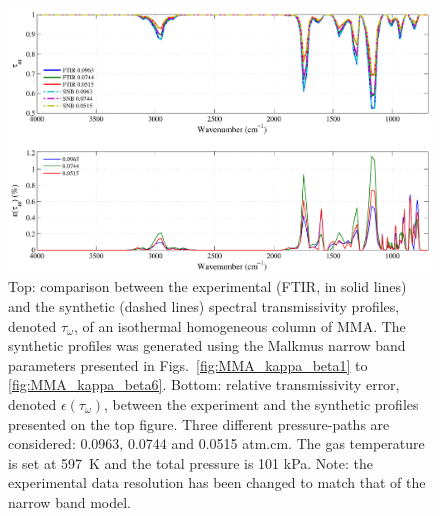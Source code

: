 \begin{figure}[p]
\includegraphics[width=\textwidth]{Figures/Comparison_Fit_MMA_MALKMUS_Temp597K.pdf}
\caption{Top: comparison between the experimental (FTIR, in solid lines) and the synthetic (dashed lines) spectral transmissivity profiles, denoted $\tau_{\omega}$, of an isothermal homogeneous column of MMA. The synthetic profiles was generated using the Malkmus narrow band parameters presented in Figs.~\ref{fig:MMA_kappa_beta1} to \ref{fig:MMA_kappa_beta6}. Bottom: relative transmissivity error, denoted $\epsilon{(\tau_{\omega})}$, between the experiment and the synthetic profiles presented on the top figure. Three different pressure-paths are considered: 0.0963, 0.0744 and 0.0515 atm.cm. The gas temperature is set at 597~K and the total pressure is 101 kPa. Note: the experimental data resolution has been changed to match that of the narrow band model. \label{fig:MMA_SNBVerify_597K}}
\end{figure}

